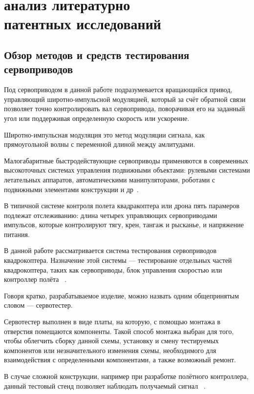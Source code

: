 

\section{анализ литературно \\ патентных исследований}

\subsection{Обзор методов и средств тестирования сервоприводов}

Под сервоприводом в данной работе подразумевается вращающийся привод,
управляющий широтно-импульсной модуляцией, который за счёт обратной
связи позволяет точно контролировать вал сервопривода, поворачивая его
на заданный угол или поддерживая определенную скорость или ускорение.

Широтно-импульсная модуляция это метод модуляции сигнала, как
прямоугольной волны с переменной длиной между амлитудами.

Малогабаритные быстродействующие сервоприводы применяются в
современных высокоточных системах управления подвижными объектами:
рулевыми системами летательных аппаратов, автоматическими
манипуляторами, роботами с подвижными элементами конструкции и
др~\cite{dyakovSUBSTANTIATIONRELIABILITYSERVOMOTORS2023}.

В типичной системе контроля полета квадракоптера или дрона пять
парамеров подлежат отслеживанию: длина четырех управляющих
сервоприводами импульсов, которые контролируют тягу, крен, тангаж и
рысканье, и напряжение питания.

В данной работе рассматривается система тестирования сервоприводов
квадрокоптера.  Назначение этой системы — тестирование отдельных
частей квадрокоптера, таких как сервоприводы,
блок управления скоростью или контроллер полёта ~\cite{Elector521}.

Говоря кратко, разрабатываемое изделие,
можно назвать одним общепринятым словом — сервотестер.

Сервотестер выполнен в виде платы, на которую, с помощью монтажа в
отверстия помещаются компоненты. Такой способ монтажа выбран для того,
чтобы облегчить сборку данной схемы, установку и смену тестируемых
компонентов или незначительного изменения схемы, необходимого для
взаимодействия с определенными компонентами, а также возможный ремонт.



В случае сложной конструкции, например при разработке полётного
контроллера, данный тестовый стенд позволяет наблюдать получаемый
сигнал ~\cite{Elector521}.
